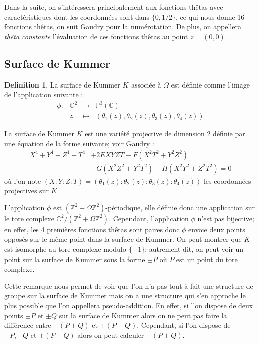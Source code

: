\documentclass[a4paper]{article}
\theoremstyle{definition}
\newtheorem{definition}{Definition}[section]
\theoremstyle{remark}
\numberwithin{equation}{section}
\begin{document}
Dans la suite, on s'intéressera principalement aux fonctions thêtas avec caractéristiques dont les coordonnées sont dans $\{0,1/2\}$, ce qui nous donne 16 fonctions thêtas, on suit Gaudry \cite{gaudry} pour la numérotation. De plus, on appellera \emph{thêta constante} l'évaluation de ces fonctions thêtas au point $z=(0,0)$.

\subsection{Surface de Kummer}

\begin{definition}
La surface de Kummer $K$ associée à $\Omega$ est définie comme l'image de l'application suivante :
\begin{equation*}
\begin{array}{lrcl}
\phi :&\mathbb{C}^2 & \longrightarrow & \mathbb{P}^3(\mathbb{C}) \\
& z & \longmapsto & (\theta_1(z),\theta_2(z),\theta_3(z),\theta_4(z))
\end{array}
\end{equation*}
\end{definition}

La surface de Kummer $K$ est une variété projective de dimension $2$ définie par une équation de la forme suivante; voir Gaudry \cite{gaudry} :
\begin{align*}
X^4+Y^4+Z^4+T^4&+2EXYZT-F(X^2T^2+Y^2Z^2) \\
&-G(X^2Z^2+Y^2T^2)-H(X^2Y^2+Z^2T^2)=0
\end{align*}
où l'on note $(X:Y:Z:T)=(\theta_1(z):\theta_2(z):\theta_3(z):\theta_4(z))$ les coordonnées projectives sur $K$.

L'application $\phi$ est $(\mathbb{Z}^2 + \Omega\mathbb{Z}^2)$-périodique, elle définie donc une application sur le tore complexe $\mathbb{C}^2/(\mathbb{Z}^2+\Omega\mathbb{Z}^2)$. Cependant, l'application $\phi$ n'est pas bijective; en effet, les 4 premières fonctions thêtas sont paires donc $\phi$ envoie deux points opposés sur le même point dans la surface de Kummer. On peut montrer que $K$ est isomorphe au tore complexe modulo $\{\pm 1\}$; autrement dit, on peut voir un point sur la surface de Kummer sous la forme $\pm P$ où $P$ est un point du tore complexe.

Cette remarque nous permet de voir que l'on n'a pas tout à fait une structure de groupe sur la surface de Kummer mais on a une structure qui s'en approche le plus possible que l'on appellera pseudo-addition. En effet, si l'on dispose de deux points $\pm P$ et $\pm Q$ sur la surface de Kummer alors on ne peut pas faire la différence entre $\pm(P+Q)$ et $\pm(P-Q)$. Cependant, si l'on dispose de $\pm P,\pm Q$ et $\pm(P-Q)$ alors on peut calculer $\pm(P+Q)$.
\end{document}
